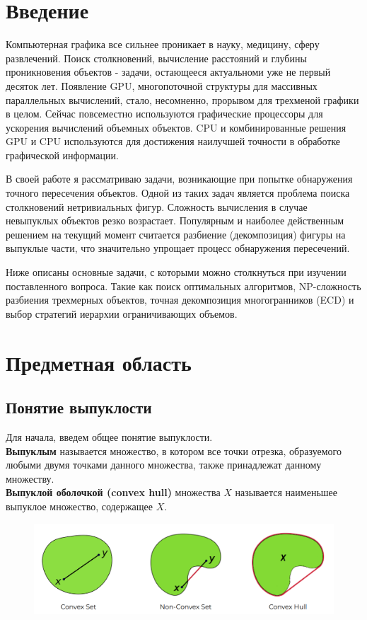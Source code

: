 \documentclass[11pt,a4paper]{extarticle}
\begin{document}
	\newpage
	\tableofcontents
	
	\newpage

	\section{Введение}
	Компьютерная графика все сильнее проникает в науку, медицину, сферу развлечений.
	Поиск столкновений, вычисление расстояний и глубины проникновения объектов - задачи, остающееся актуальноми уже не первый десяток лет. 
	Появление GPU, многопоточной структуры для массивных параллельных вычислений, стало, несомненно, прорывом для трехменой графики в целом.
	Сейчас повсеместно используются графические процессоры для ускорения вычислений объемных объектов.
	CPU и комбинированные решения GPU и CPU используются для достижения наилучшей точности в обработке графической информации.
	
	В своей работе я рассматриваю задачи, возникающие при попытке обнаружения точного пересечения объектов.
	Одной из таких задач является проблема поиска столкновений нетривиальных фигур.
	Сложность вычисления в случае невыпуклых объектов резко возрастает. 
	Популярным и наиболее действенным решением на текущий момент считается разбиение (декомпозиция) фигуры на выпуклые части, что значительно упрощает процесс обнаружения пересечений.

	Ниже описаны основные задачи, с которыми можно столкнуться при изучении поставленного вопроса.
	Такие как поиск оптимальных алгоритмов, NP-сложность разбиения трехмерных объектов, точная декомпозиция многогранников (ECD) и выбор стратегий иерархии ограничивающих объемов.
	
	\section{Предметная область}
		\subsection{Понятие выпуклости}
			Для начала, введем общее понятие выпуклости.\\
			\textbf{Выпуклым} называется множество, в котором все точки отрезка, образуемого любыми двумя точками данного множества, также принадлежат данному множеству.\\
			\textbf{Выпуклой оболочкой (convex hull)} множества $X$ называется наименьшее выпуклое множество, содержащее $X$.
			\begin{figure}[ht]
				\centering
				\includegraphics[width=\textwidth]{convexes}
			\end{figure}
		\newpage
\end{document}
